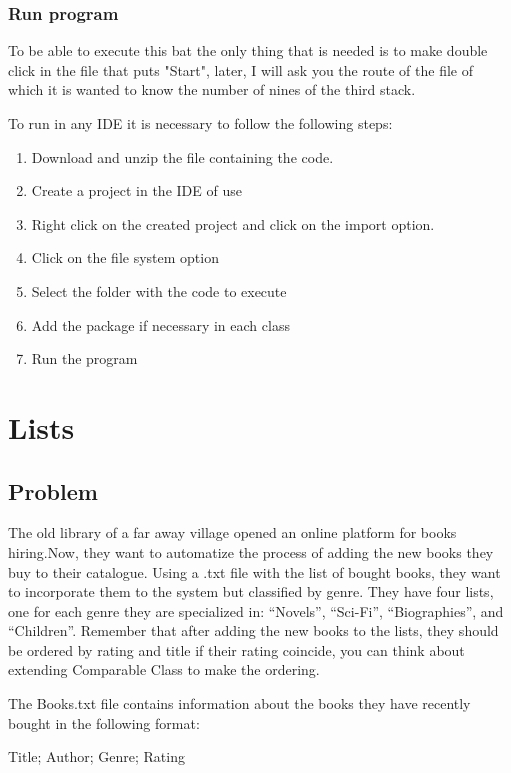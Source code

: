\documentclass[a4paper]{article}
\theoremstyle{plain}
\theoremstyle{definition}
\begin{document}
        \subsubsection{Run program}
        To be able to execute this bat the only thing that is needed is to make double click in the file that puts "Start", later, I will ask you the route of the file of which it is wanted to know the number of nines of the third stack.\newline
	
        To run in any IDE it is necessary to follow the following steps:
        \begin{enumerate}
            \item Download and unzip the file containing the code.
            \item Create a project in the IDE of use
            \item Right click on the created project and click on the import option. 
            \item Click on the file system option 
            \item Select the folder with the code to execute
            \item Add the package if necessary in each class
            \item Run the program
        \end{enumerate}
\newpage
	\section{Lists}
	    \subsection{Problem}
	    The old library of a far away village opened an online platform for books hiring.Now, they want to automatize the process of adding the new books they buy to their catalogue. Using a .txt file with the list of bought books, they want to incorporate them to the system but classified by genre. They have four lists, one for each genre they are specialized in: “Novels”, “Sci-Fi”, “Biographies”, and “Children”. Remember that after adding the new books to the lists, they should be ordered by rating and title if their rating coincide, you can think about extending Comparable Class to make the ordering.\newline
	    
        The Books.txt file contains information about the books they have recently bought in the following format:\newline
            \begin{center}
                Title; Author; Genre; Rating\newline
            \end{center}
    
\end{document}
